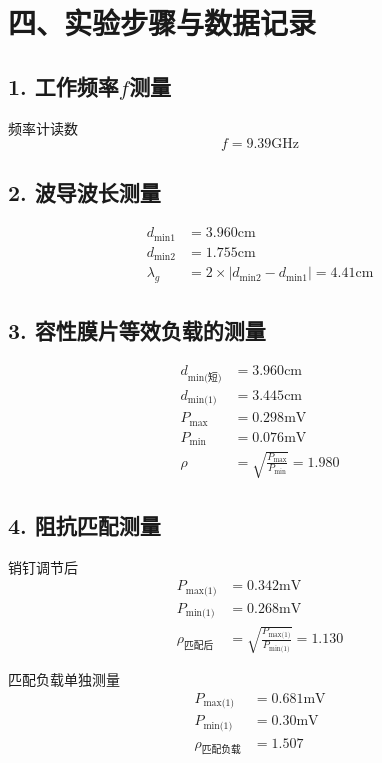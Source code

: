 \documentclass[12pt,a4paper]{article}
\begin{document}
\section*{四、实验步骤与数据记录}

\subsection*{1. 工作频率$f$测量}
频率计读数$$f = 9.39 \text{GHz}$$

\subsection*{2. 波导波长测量}
\begin{align*}
    d_{\text{min1}} &=3.960 \text{cm} \\
    d_{\text{min2}} &=1.755\text{cm} \\
    \lambda_g &= 2 \times |d_{\text{min2}} - d_{\text{min1}}| = 4.41\text{cm}
\end{align*}

\subsection*{3. 容性膜片等效负载的测量}
\begin{align*}
    d_{\text{min(短)}} &= 3.960\text{cm} \\
    d_{\text{min(1)}} &= 3.445 \text{cm} \\
    P_{\text{max}} &= 0.298 \text{mV} \\
    P_{\text{min}} &= 0.076 \text{mV} \\
    \rho &= \sqrt{\frac{P_{\text{max}}}{P_{\text{min}}}} = 1.980
\end{align*}

\subsection*{4. 阻抗匹配测量}
销钉调节后
\begin{align*}
    P_{\text{max(1)}} &= 0.342 \text{mV} \\
    P_{\text{min(1)}} &= 0.268 \text{mV} \\
    \rho_{\text{匹配后}} &= \sqrt{\frac{P_{\text{max(1)}}}{P_{\text{min(1)}}}} = 1.130
\end{align*}

匹配负载单独测量
\begin{align*}
    P_{\text{max(1)}} &= 0.681 \text{mV} \\
    P_{\text{min(1)}} &= 0.30 \text{mV} \\
    \rho_{\text{匹配负载}} &= 1.507
\end{align*}
\end{document}
